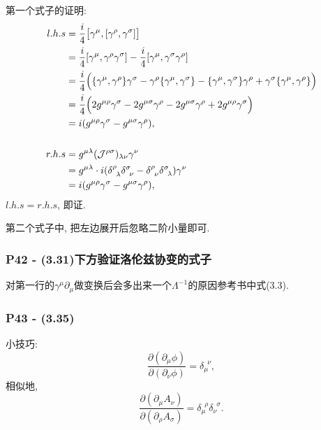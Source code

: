\documentclass[cn,hazy,green,11pt,device=normal,chinesefont=founder]{elegantnote}
\begin{document}
第一个式子的证明: 
\begin{equation}
  \begin{aligned}
    l.h.s &= \frac{i}{4}\bigl[\gamma^\mu, [\gamma^\rho, \gamma^\sigma]\bigr] \\
    &= \frac{i}{4}[\gamma^\mu, \gamma^\rho \gamma^\sigma] - \frac{i}{4}[\gamma^\mu, \gamma^\sigma \gamma^\rho] \\ 
    &= \frac{i}{4}\Bigl(\{\gamma^\mu, \gamma^\rho\}\gamma^\sigma - \gamma^\rho\{\gamma^\mu, \gamma^\sigma\} - \{\gamma^\mu, \gamma^\sigma\}\gamma^\rho + \gamma^\sigma\{\gamma^\mu, \gamma^\rho\}\Bigr) \\
    &= \frac{i}{4}\Bigl(2g^{\mu\rho}\gamma^\sigma - 2g^{\mu\sigma}\gamma^\rho - 2g^{\mu\sigma}\gamma^\rho + 2g^{\mu\rho}\gamma^\sigma \Bigr) \\
    &= i(g^{\mu\rho}\gamma^\sigma - g^{\mu\sigma}\gamma^\rho), \\
    \ \\
    r.h.s &= g^{\mu\lambda}(\mathcal{J}^{\rho\sigma})_{\lambda\nu} \gamma^\nu \\
    &= g^{\mu\lambda}\cdot i(\delta^\rho_{\phantom{1}\lambda} \delta^\sigma_{\phantom{1}\nu} - \delta^\rho_{\phantom{1}\nu} \delta^\sigma_{\phantom{1}\lambda}) \gamma^\nu \\ 
    &= i(g^{\mu\rho}\gamma^\sigma - g^{\mu\sigma}\gamma^\rho), 
  \end{aligned}
\end{equation}
$l.h.s = r.h.s$, 即证. 

第二个式子中, 把左边展开后忽略二阶小量即可. 

\subsubsection{P42 - (3.31)下方验证洛伦兹协变的式子}

对第一行的$\gamma^\mu \partial_\mu$做变换后会多出来一个$\Lambda^{-1}$的原因参考书中式(3.3).

\subsubsection{P43 - (3.35)}

小技巧: 
\begin{equation}
  \frac{\partial (\partial_\mu \phi)}{\partial (\partial_\nu \phi)} = \delta_\mu^{\phantom{1}\nu}, 
\end{equation}
相似地, 
\begin{equation}
  \frac{\partial (\partial_\mu A_\nu)}{\partial (\partial_\rho A_\sigma)} = \delta_\mu^{\phantom{1}\rho}\delta_\nu^{\phantom{1}\sigma}.
\end{equation}
\end{document}
